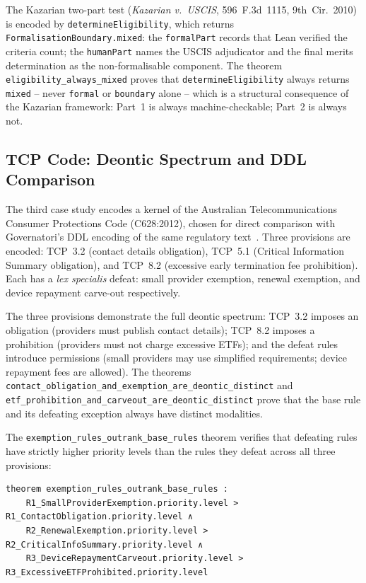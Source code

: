 \documentclass[runningheads]{llncs}
\begin{document}
The Kazarian two-part test (\textit{Kazarian v.\ USCIS}, 596~F.3d~1115,
9th~Cir.~2010) is encoded by \texttt{determineEligibility}, which returns
\texttt{FormalisationBoundary.mixed}: the \texttt{formalPart} records that Lean
verified the criteria count; the \texttt{humanPart} names the USCIS adjudicator
and the final merits determination as the non-formalisable component. The
theorem \texttt{eligibility\_always\_mixed} proves that
\texttt{determineEligibility} always returns \texttt{mixed} -- never
\texttt{formal} or \texttt{boundary} alone -- which is a structural consequence
of the Kazarian framework: Part~1 is always machine-checkable; Part~2 is always
not.

\subsection{TCP Code: Deontic Spectrum and DDL Comparison}

The third case study encodes a kernel of the Australian Telecommunications
Consumer Protections Code (C628:2012), chosen for direct comparison with
Governatori's DDL encoding of the same regulatory
text~\cite{governatori2005representing,governatori2019compliance}. Three
provisions are encoded: TCP~3.2 (contact details obligation), TCP~5.1 (Critical
Information Summary obligation), and TCP~8.2 (excessive early termination fee
prohibition). Each has a \textit{lex specialis} defeat: small provider
exemption, renewal exemption, and device repayment carve-out respectively.

The three provisions demonstrate the full deontic spectrum: TCP~3.2 imposes an
obligation (providers must publish contact details); TCP~8.2 imposes a
prohibition (providers must not charge excessive ETFs); and the defeat rules
introduce permissions (small providers may use simplified requirements; device
repayment fees are allowed). The theorems
\texttt{contact\_obligation\_and\_exemption\_are\_deontic\_distinct} and
\texttt{etf\_prohibition\_and\_carveout\_are\_deontic\_distinct} prove that the
base rule and its defeating exception always have distinct modalities.

The \texttt{exemption\_rules\_outrank\_base\_rules} theorem verifies that
defeating rules have strictly higher priority levels than the rules they defeat
across all three provisions:

\begin{lstlisting}[language=lean4]
theorem exemption_rules_outrank_base_rules :
    R1_SmallProviderExemption.priority.level > R1_ContactObligation.priority.level ∧
    R2_RenewalExemption.priority.level > R2_CriticalInfoSummary.priority.level ∧
    R3_DeviceRepaymentCarveout.priority.level > R3_ExcessiveETFProhibited.priority.level
\end{lstlisting}
\end{document}
